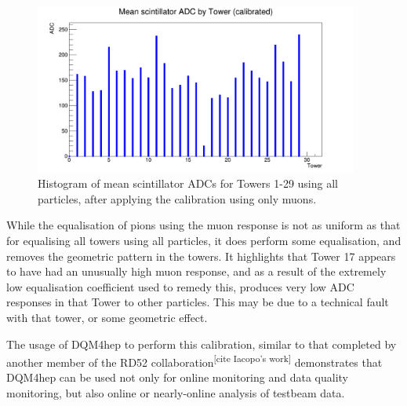 \begin{figure}[h]
	\centering
	\includegraphics[width=0.95\textwidth]{../Pictures/IDEA/Calibration/towerplot-scintillator-mean-muoncalibrated-all.png}
	\caption{Histogram of mean scintillator \acrshort{ADC}s for Towers 1-29 using all particles, after applying the calibration using only muons.}
	\label{figure:testbeam/results/towerplot-mean-muoncalibrated-all}
\end{figure}

While the equalisation of pions using the muon response is not as uniform as that for equalising all towers using all particles, it does perform some equalisation, and removes the geometric pattern in the towers. It highlights that Tower 17 appears to have had an unusually high muon response, and as a result of the extremely low equalisation coefficient used to remedy this, produces very low ADC responses in that Tower to other particles. This may be due to a technical fault with that tower, or some geometric effect.

The usage of DQM4hep to perform this calibration, similar to that completed by another member of the RD52 collaboration\textsuperscript{[cite Iacopo's work]} demonstrates that DQM4hep can be used not only for online monitoring and data quality monitoring, but also online or nearly-online analysis of testbeam data.

